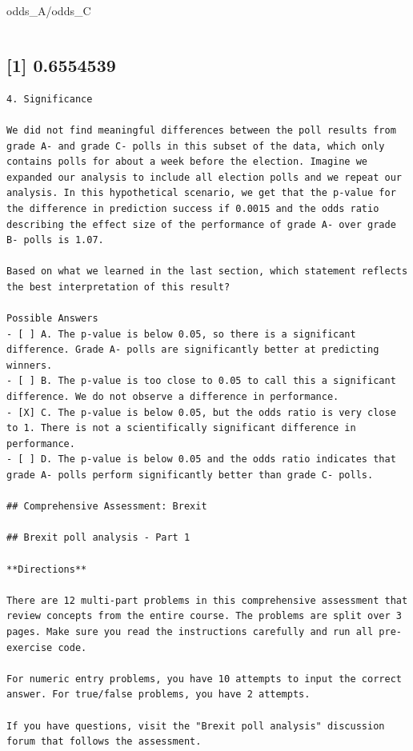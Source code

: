 \documentclass[
]{article}
\begin{document}
odds\_A/odds\_C

\begin{verbatim}
\end{verbatim}

\hypertarget{section-9}{%
\subsection{{[}1{]} 0.6554539}\label{section-9}}

\begin{verbatim}
4. Significance

We did not find meaningful differences between the poll results from grade A- and grade C- polls in this subset of the data, which only contains polls for about a week before the election. Imagine we expanded our analysis to include all election polls and we repeat our analysis. In this hypothetical scenario, we get that the p-value for the difference in prediction success if 0.0015 and the odds ratio describing the effect size of the performance of grade A- over grade B- polls is 1.07.

Based on what we learned in the last section, which statement reflects the best interpretation of this result?

Possible Answers
- [ ] A. The p-value is below 0.05, so there is a significant difference. Grade A- polls are significantly better at predicting winners.
- [ ] B. The p-value is too close to 0.05 to call this a significant difference. We do not observe a difference in performance.
- [X] C. The p-value is below 0.05, but the odds ratio is very close to 1. There is not a scientifically significant difference in performance.
- [ ] D. The p-value is below 0.05 and the odds ratio indicates that grade A- polls perform significantly better than grade C- polls.

## Comprehensive Assessment: Brexit

## Brexit poll analysis - Part 1

**Directions**

There are 12 multi-part problems in this comprehensive assessment that review concepts from the entire course. The problems are split over 3 pages. Make sure you read the instructions carefully and run all pre-exercise code.

For numeric entry problems, you have 10 attempts to input the correct answer. For true/false problems, you have 2 attempts.

If you have questions, visit the "Brexit poll analysis" discussion forum that follows the assessment.


\end{verbatim}
\end{document}
